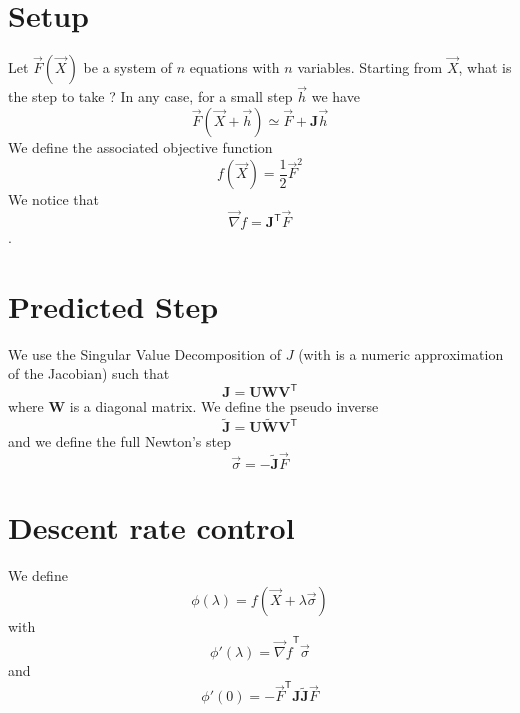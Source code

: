 \documentclass[aps,twocolumn]{revtex4}
\newcommand{\mymat}[1]{\boldsymbol{#1}}
\newcommand{\mytrn}[1]{{#1}^{\mathsf{T}}}
\newcommand{\mygrad}{\vec{\nabla}}
\begin{document}
\section{Setup}
Let $\vec{F}\left(\vec{X}\right)$ be a system of $n$ equations with $n$ variables.
Starting from $\vec{X}$, what is the step to take ?
In any case, for a small step $\vec{h}$ we have
\begin{equation}
	\vec{F}\left(\vec{X}+\vec{h}\right) \simeq \vec{F} + \mymat{J} \vec{h}
\end{equation}
We define the associated objective function
\begin{equation}
	f\left(\vec{X}\right) = \frac{1}{2} \vec{F}^2
\end{equation}
We notice that
\begin{equation}
	\mygrad f = \mytrn{\mymat{J}}\vec{F}
\end{equation}.

\section{Predicted Step}
We use the Singular Value Decomposition of $J$ (with is a numeric approximation of the Jacobian)
such that
\begin{equation}
	\mymat{J} = \mymat{U} \mymat{W} \mytrn{\mymat{V}}
\end{equation}
where $\mymat{W}$ is a diagonal matrix.
We define the pseudo inverse
\begin{equation}
	\tilde{\mymat{J}}= \mymat{U} \tilde{\mymat{W}} \mytrn{\mymat{V}}
\end{equation}
and we define the full Newton's step 
\begin{equation}
	\vec{\sigma} = -\tilde{\mymat{J}} \vec{F}
\end{equation}

\section{Descent rate control}
We define
\begin{equation}
	\phi\left(\lambda\right) = f\left(\vec{X}+\lambda\vec{\sigma}\right)
\end{equation}
with
\begin{equation}
	\phi'\left(\lambda\right) = \mytrn{\mygrad f } \vec{\sigma}
\end{equation}
and
\begin{equation}
	\phi'\left(0\right)  = - \mytrn{\vec{F}} \mymat{J} \tilde{\mymat{J}} \vec{F}
\end{equation}
\end{document}
